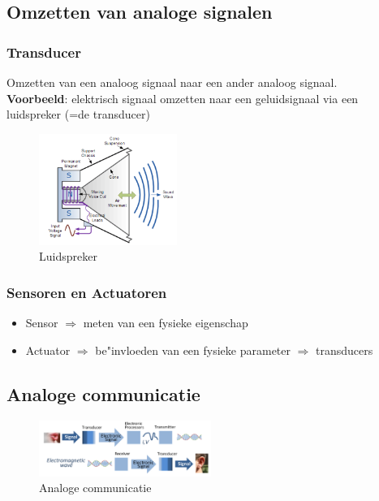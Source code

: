 \documentclass{article}
\newcommand{\bold}[1]{\textbf{#1}}
\begin{document}
\subsection{Omzetten van analoge signalen}

\subsubsection{Transducer}
Omzetten van een analoog signaal naar een ander analoog signaal.\\
\bold{Voorbeeld}: elektrisch signaal omzetten naar een geluidsignaal via een luidspreker (=de transducer)

\begin{figure}[H]
    \centering
    \includegraphics[width=0.4\textwidth]{Screenshot_20200315_111132.png}
    \caption{Luidspreker}
\end{figure}

\subsubsection{Sensoren en Actuatoren}
\begin{itemize}
    \item Sensor $\Rightarrow$ meten van een fysieke eigenschap
    \item Actuator $\Rightarrow$ be"invloeden van een fysieke parameter $\Rightarrow$ transducers 
\end{itemize}

\subsection{Analoge communicatie}

\begin{figure}[H]
    \centering
    \includegraphics[width=0.5\textwidth]{Screenshot_20200315_111720.png}
    \caption{Analoge communicatie}
\end{figure}
\end{document}
